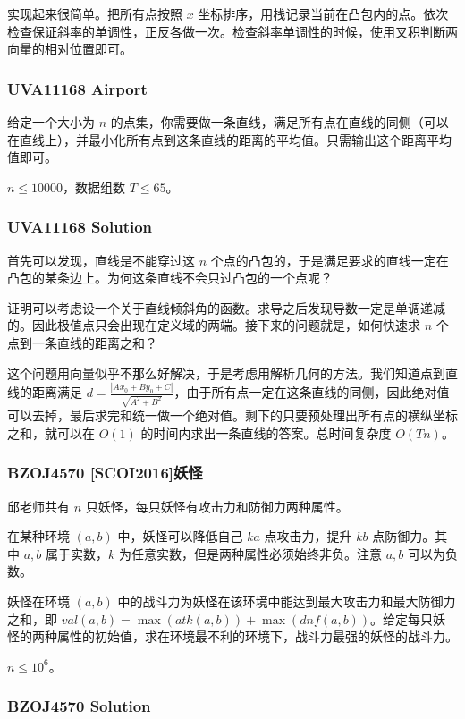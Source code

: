 \documentclass[10pt]{beamer}
\begin{document}
\begin{CJK}{UTF8}{gkai}
\begin{spacing}{1.2}
\begin{frame}
			实现起来很简单。把所有点按照 $x$ 坐标排序，用栈记录当前在凸包内的点。依次检查保证斜率的单调性，正反各做一次。检查斜率单调性的时候，使用叉积判断两向量的相对位置即可。

		\end{frame}
		\begin{frame}
			\frametitle{UVA11168 Airport}

			给定一个大小为 $n$ 的点集，你需要做一条直线，满足所有点在直线的同侧（可以在直线上），并最小化所有点到这条直线的距离的平均值。只需输出这个距离平均值即可。 \pause

			$n \le 10000$，数据组数 $T \le 65$。

		\end{frame}
		\begin{frame}
			\frametitle{UVA11168 Solution}

			首先可以发现，直线是不能穿过这 $n$ 个点的凸包的，于是满足要求的直线一定在凸包的某条边上。为何这条直线不会只过凸包的一个点呢？ \pause

			证明可以考虑设一个关于直线倾斜角的函数。求导之后发现导数一定是单调递减的。因此极值点只会出现在定义域的两端。接下来的问题就是，如何快速求 $n$ 个点到一条直线的距离之和？ \pause

			这个问题用向量似乎不那么好解决，于是考虑用解析几何的方法。\pause 我们知道点到直线的距离满足 $d = \frac{|Ax_0+By_0+C|}{\sqrt{A^2 + B^2}}$，由于所有点一定在这条直线的同侧，因此绝对值可以去掉，最后求完和统一做一个绝对值。剩下的只要预处理出所有点的横纵坐标之和，就可以在 $O(1)$ 的时间内求出一条直线的答案。总时间复杂度 $O(Tn)$。

		\end{frame}
		\begin{frame}
			\frametitle{BZOJ4570 [SCOI2016]妖怪}

			邱老师共有 $n$ 只妖怪，每只妖怪有攻击力和防御力两种属性。

			在某种环境 $(a,b)$ 中，妖怪可以降低自己 $ka$ 点攻击力，提升 $kb$ 点防御力。其中 $a,b$ 属于实数，$k$ 为任意实数，但是两种属性必须始终非负。注意 $a,b$ 可以为负数。

			妖怪在环境 $(a,b)$ 中的战斗力为妖怪在该环境中能达到最大攻击力和最大防御力之和，即 $val(a,b) = \max(atk(a,b)) + \max(dnf(a,b))$。给定每只妖怪的两种属性的初始值，求在环境最不利的环境下，战斗力最强的妖怪的战斗力。 \pause

			$n \le 10^6$。

		\end{frame}
		\begin{frame}
			\frametitle{BZOJ4570 Solution}


\end{frame}
\end{spacing}
\end{CJK}
\end{document}
